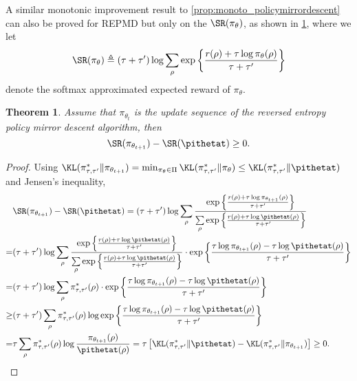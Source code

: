 \documentclass{article}
\newcommand{\todor}[2][]{\todo[color=blue!25,size=\small,#1]{R: #2}}
\newtheorem{thm}{Theorem}
\begin{document}
A similar monotonic improvement result to \cref{prop:monoto_policymirrordescent} can also be proved for REPMD but only on the $\SR(\pi_\theta) $, as shown in \cref{thm:monotonically_increasing_sr_property}, where we let
\[
\SR(\pi_\theta) \triangleq (\tau + \tau^{\prime})\log{ \sum_{\rho}{ \exp\left\{ \frac{r(\rho) + \tau \log{\pi_\theta(\rho)} }{\tau + \tau^{\prime}} \right\} }}
\]
denote the softmax approximated expected reward of $\pi_\theta$.
\begin{thm}
	\label{thm:monotonically_increasing_sr_property}
	Assume that $\pi_{\theta_{t}}$ is the update sequence of the reversed entropy policy mirror descent algorithm, then 
	\[
	\SR(\pi_{\theta_{t+1}}) - \SR(\pithetat)\ge 0.
	\] 
\end{thm}
\begin{proof}
	Using $\KL(\pi_{\tau,\tau^{\prime}}^* \| \pi_{\theta_{t+1}}) = \min_{\pi_\theta \in \Pi}{ \KL(\pi_{\tau,\tau^{\prime}}^* \| \pi_\theta)} \le \KL(\pi_{\tau,\tau^{\prime}}^* \| \pithetat)$ and Jensen's inequality,
	\begin{equation*}
	\begin{split}
	&\SR(\pi_{\theta_{t+1}}) - \SR(\pithetat) = (\tau + \tau^{\prime}) \log{ \sum\limits_{\rho}{ \frac{  \exp\left\{ \frac{r(\rho) + \tau \log{\pi_{\theta_{t+1}}(\rho)} }{\tau + \tau^{\prime}} \right\}  }{ \sum\limits_{\rho}{  \exp\left\{ \frac{r(\rho) + \tau \log{\pithetat(\rho)} }{\tau + \tau^{\prime}} \right\} } }  } } \\
	=& (\tau + \tau^{\prime}) \log{ \sum\limits_{\rho}{ \frac{  \exp\left\{ \frac{r(\rho) + \tau \log{\pithetat(\rho)} }{\tau + \tau^{\prime}} \right\}  }{ \sum\limits_{\rho}{  \exp\left\{ \frac{r(\rho) + \tau \log{\pithetat(\rho)} }{\tau + \tau^{\prime}} \right\} } }  } \cdot \exp\left\{ \frac{\tau \log{\pi_{\theta_{t+1}}(\rho)} - \tau \log{\pithetat(\rho)} }{\tau + \tau^{\prime}} \right\} } \\
	=& (\tau + \tau^{\prime}) \log{ \sum\limits_{\rho}{ \pi_{\tau,\tau^{\prime}}^*(\rho) } \cdot \exp\left\{ \frac{\tau \log{\pi_{\theta_{t+1}}(\rho)} - \tau \log{\pithetat(\rho)} }{\tau + \tau^{\prime}} \right\} } \\
	\ge& (\tau + \tau^{\prime}) \sum\limits_{\rho}{ \pi_{\tau,\tau^{\prime}}^*(\rho) \log{ \exp\left\{ \frac{\tau \log{\pi_{\theta_{t+1}}(\rho)} - \tau \log{\pithetat(\rho)} }{\tau + \tau^{\prime}} \right\} } } \\
	=& \tau \sum\limits_{\rho}{ \pi_{\tau,\tau^{\prime}}^*(\rho) \log{ \frac{\pi_{\theta_{t+1}}(\rho)}{\pithetat(\rho)} } } = \tau \left[ \KL(\pi_{\tau,\tau^{\prime}}^* \| \pithetat) - \KL(\pi_{\tau,\tau^{\prime}}^* \| \pi_{\theta_{t+1}})\right] \ge 0. \qedhere
	\end{split}
	\end{equation*}
\end{proof}
\end{document}
